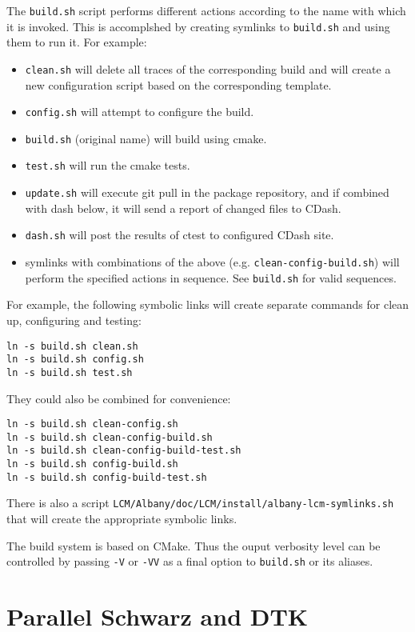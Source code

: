 \documentclass{article}
\begin{document}
The \verb+build.sh+ script performs different actions according to the name with
which it is invoked. This is accomplshed by creating symlinks to \verb+build.sh+
and using them to run it. For example:
\begin{itemize}
\item \verb+clean.sh+ will delete all traces of the corresponding build and will
  create a new configuration script based on the corresponding template.

\item \verb+config.sh+ will attempt to configure the build.

\item \verb+build.sh+ (original name) will build using cmake.

\item \verb+test.sh+ will run the cmake tests.

\item \verb+update.sh+ will execute git pull in the package repository, and if
  combined with dash below, it will send a report of changed files to CDash.

\item \verb+dash.sh+ will post the results of ctest to configured CDash site.

\item symlinks with combinations of the above
  (e.g. \verb+clean-config-build.sh+) will perform the specified actions in
  sequence. See \verb+build.sh+ for valid sequences.
\end{itemize}
For example, the following symbolic links will create separate
commands for clean up, configuring and testing:
\begin{verbatim}
ln -s build.sh clean.sh
ln -s build.sh config.sh
ln -s build.sh test.sh
\end{verbatim}
They could also be combined for convenience:
\begin{verbatim}
ln -s build.sh clean-config.sh
ln -s build.sh clean-config-build.sh
ln -s build.sh clean-config-build-test.sh
ln -s build.sh config-build.sh
ln -s build.sh config-build-test.sh
\end{verbatim}
There is also a script
\verb+LCM/Albany/doc/LCM/install/albany-lcm-symlinks.sh+
that will create the appropriate symbolic links.

The build system is based on CMake. Thus the ouput verbosity level can be
controlled by passing \verb+-V+ or \verb+-VV+ as a final option to
\verb+build.sh+ or its aliases.

\section{Parallel Schwarz and DTK}
\label{sec:dtk}
\end{document}
